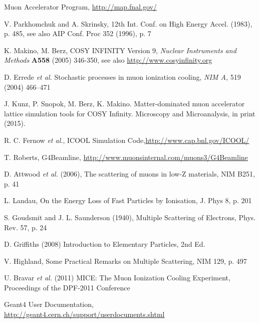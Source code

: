 \documentclass[a4paper,11pt]{article}
\begin{document}
\begin{thebibliography}{9}

Muon Accelerator Program, \url{http://map.fnal.gov/}

V. Parkhomchuk and A. Skrinsky, 12th Int. Conf. on High Energy Accel. (1983), p. 485, see also AIP Conf. Proc 352 (1996), p. 7 

K. Makino, M. Berz, COSY INFINITY Version 9, \emph{Nuclear Instruments and Methods} \textbf{A558} (2005) 346-350, see also \url{http://www.cosyinfinity.org}

D. Errede \emph{et al.} Stochastic processes in muon ionization cooling, \emph {NIM A,} 519 (2004) 466--471

J. Kunz, P. Snopok, M. Berz, K. Makino. Matter-dominated muon accelerator lattice simulation tools for COSY Infinity. Microscopy and Microanalysis, in print (2015).

R. C. Fernow \emph{et al.}, ICOOL Simulation Code,\url{http://www.cap.bnl.gov/ICOOL/}

T. Roberts, G4Beamline, \url{http://www.muonsinternal.com/muons3/G4Beamline}

D. Attwood \emph{et al.} (2006), The scattering of muons in low-Z materials, NIM B251, p. 41

L. Landau, On the Energy Loss of Fast Particles by Ionisation, J. Phys 8, p. 201

S. Goudsmit and J. L. Saunderson (1940), Multiple Scattering of Electrons, Phys. Rev. 57, p. 24

D. Griffiths (2008) Introduction to Elementary Particles, 2nd Ed. 

V. Highland, Some Practical Remarks on Multiple Scattering, NIM 129, p. 497

U. Bravar \emph{et al.} (2011) MICE: The Muon Ionization Cooling Experiment, Proceedings of the DPF-2011 Conference

Geant4 User Documentation, \url{http://geant4.cern.ch/support/userdocuments.shtml}





\end{thebibliography}
\end{document}
